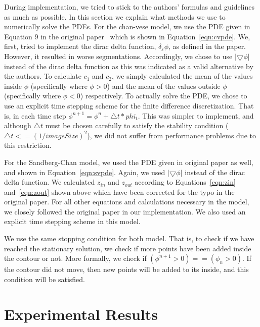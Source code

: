 \documentclass[10pt,twocolumn,letterpaper]{article}
\begin{document}
During implementation, we tried to stick to the authors' formulas and guidelines as much as possible. In this section we explain what methods we use to
numerically solve the PDEs. For the chan-vese model, we use the PDE given in Equation 9 in the original paper~\cite{chan2001active} which is shown in
Equation~\ref{eqn:cvpde}.  We, first, tried to implement the dirac delta function, $\delta_{\varepsilon}\phi$, as defined in the paper. However, it resulted in
worse segmentations. Accordingly, we chose to use $|\bigtriangledown\phi|$ instead of the dirac delta function as this
was indicated as a valid alternative by the authors. To calculate $c_{1}$ and $c_{2}$, we simply calculated the mean of the values inside $\phi$ (specifically
where $\phi > 0$) and the mean of the values outside $\phi$ (specifically where $\phi < 0$) respectively. To actually solve the PDE, we chose to use an explicit
time stepping scheme for the finite difference discretization. That is, in each time step $\phi^{n+1} = \phi^n + \triangle t*phi_t$. This was simpler to
implement, and although $\triangle t$ must be chosen carefully to satisfy the stability condition ($\triangle t <= (1/imageSize)^2$), we did not suffer from
performance problems due to this restriction.

For the Sandberg-Chan model, we used the PDE given in original paper as well, and shown in Equation~\ref{eqn:svpde}. Again, we used $|\bigtriangledown\phi|$
instead of the dirac delta function. We calculated $z_{in}$ and $z_{out}$ according to Equations~\ref{eqn:zin} and~\ref{eqn:zout} shown above which have been
corrected for
the typo in the original paper. For all other equations and calculations necessary in the model, we closely followed the original paper in our implementation.
We also used an explicit time stepping scheme in this model. 

We use the same stopping condition for both model. That is, to check if we have reached the stationary solution, we check if more points have been added inside
the contour or not. More formally, we check if $(\phi^{n+1} > 0) == (\phi_{n} > 0)$. If the contour did not move, then new points will be added to its inside,
and this condition will be satisfied.


\section{Experimental Results}
\label{sec:results}
\end{document}
